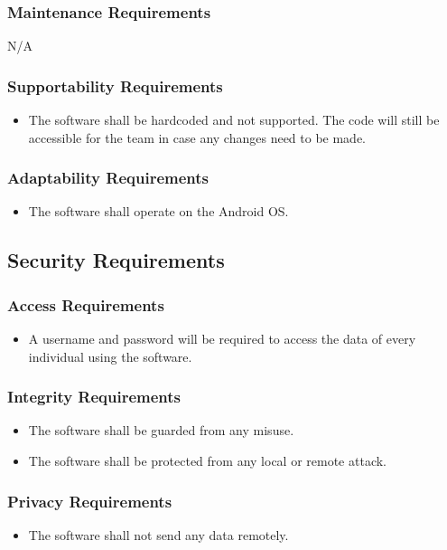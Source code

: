 \documentclass[12pt]{article}
\begin{document}
\subsubsection{Maintenance Requirements}
N/A

\subsubsection{Supportability Requirements}
\begin{itemize}
\item The software shall be hardcoded and not supported. The code will still be accessible for the team in case any changes need to be made. 
\end{itemize}

\subsubsection{Adaptability Requirements}
\begin{itemize}
\item The software shall operate on the Android OS.
\end{itemize}

\subsection{Security Requirements}

\subsubsection{Access Requirements}
\begin{itemize}
\item A username and password will be required to access the data of every individual using the software.
\end{itemize}

\subsubsection{Integrity Requirements}
\begin{itemize}
\item The software shall be guarded from any misuse.\\
\item The software shall be protected from any local or remote attack.
\end{itemize}

\subsubsection{Privacy Requirements}
\begin{itemize}
\item The software shall not send any data remotely.
\end{itemize}
\end{document}
